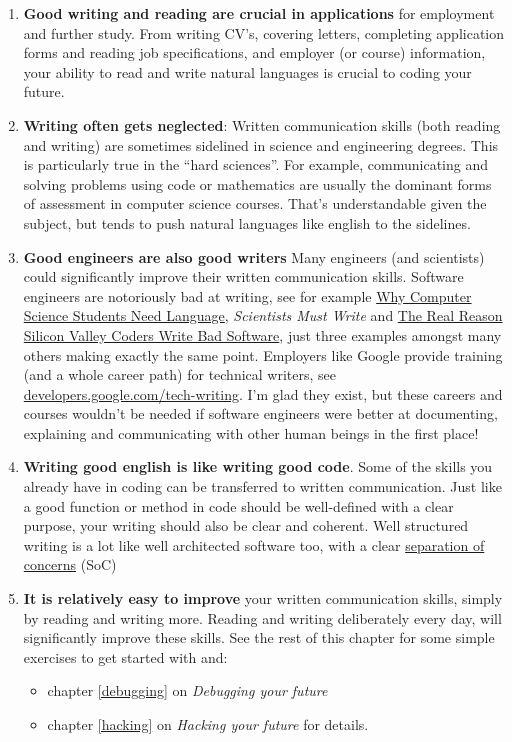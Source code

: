 \documentclass[
]{book}
\providecommand{\tightlist}{%
  \setlength{\itemsep}{0pt}\setlength{\parskip}{0pt}}
\begin{document}
\begin{enumerate}
\def\labelenumi{\arabic{enumi}.}
\tightlist
\item
  \textbf{Good writing and reading are crucial in applications} for employment and further study. From writing CV's, covering letters, completing application forms and reading job specifications, and employer (or course) information, your ability to read and write natural languages is crucial to coding your future.
\item
  \textbf{Writing often gets neglected}: Written communication skills (both reading and writing) are sometimes sidelined in science and engineering degrees. This is particularly true in the ``hard sciences''. For example, communicating and solving problems using code or mathematics are usually the dominant forms of assessment in computer science courses. That's understandable given the subject, but tends to push natural languages like english to the sidelines.
\item
  \textbf{Good engineers are also good writers} Many engineers (and scientists) could significantly improve their written communication skills. Software engineers are notoriously bad at writing, see for example \href{https://dl.acm.org/doi/10.1145/960492.960525}{Why Computer Science Students Need Language}, \citep{Beaubouef2003} \emph{Scientists Must Write} \citep{scientistsmustwrite} and \href{https://www.theatlantic.com/national/archive/2012/10/the-real-reason-silicon-valley-coders-write-bad-software/263377/}{The Real Reason Silicon Valley Coders Write Bad Software}, \citep{writebadsoftware} just three examples amongst many others making exactly the same point. Employers like Google provide training (and a whole career path) for technical writers, see \href{https://developers.google.com/tech-writing}{developers.google.com/tech-writing}. I'm glad they exist, but these careers and courses wouldn't be needed if software engineers were better at documenting, explaining and communicating with other human beings in the first place!
\item
  \textbf{Writing good english is like writing good code}. Some of the skills you already have in coding can be transferred to written communication. Just like a good function or method in code should be well-defined with a clear purpose, your writing should also be clear and coherent. Well structured writing is a lot like well architected software too, with a clear \href{https://en.wikipedia.org/wiki/Separation_of_concerns}{separation of concerns} (SoC)
\item
  \textbf{It is relatively easy to improve} your written communication skills, simply by reading and writing more. Reading and writing deliberately every day, will significantly improve these skills. See the rest of this chapter for some simple exercises to get started with and:

  \begin{itemize}
  \tightlist
  \item
    chapter \ref{debugging} on \emph{Debugging your future}
  \item
    chapter \ref{hacking} on \emph{Hacking your future} for details.
  \end{itemize}
\end{enumerate}
\end{document}
